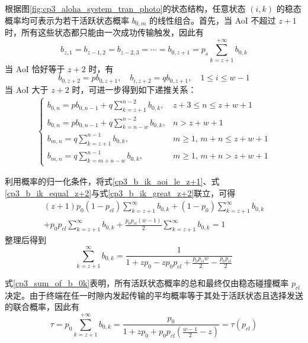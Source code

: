 根据图\ref{fig:cp3_aloha_system_tran_photo}的状态结构，任意状态 $(i,k)$ 的稳态概率均可表示为若干活跃状态概率 $b_{0,m}$ 的线性组合。首先，当 AoI 不超过 $z+1$ 时，所有这些状态都只能由一次成功传输触发，因此有
\begin{equation} \label{cp3_b_ik_aoi_le_z+1}
    b_{z,1}=b_{z-1,2}=b_{z-2,3}=\cdots=b_{0,z+1}=p_s\sum_{k=z+1}^{+\infty}b_{0,k}
\end{equation}
当 AoI 恰好等于 $z+2$ 时，有
\begin{equation}\label{cp3_b_ik_equal_z+2}
    b_{0,z+2} = pb_{0,z+1},\quad b_{i,z+2}=qb_{0,z+1},\quad1\leq i \leq w-1
\end{equation}
当 AoI 大于 $z+2$ 时，可进一步得到如下递推关系：
\begin{equation}\label{cp3_b_ik_great_z+2}
\begin{gathered}
\begin{cases}
    \displaystyle b_{0,n} = p b_{0,n-1} + q \sum_{k=z+1}^{n-2} b_{0,k}, & z+3 \le n \le z+w+1 \\[12pt]
    \displaystyle b_{0,n} = p b_{0,n-1} + q \sum_{k=n-w}^{n-2} b_{0,k}, & n > z+w+1 \\[12pt]
    \displaystyle b_{m,n} = q \sum_{k=z+1}^{n-1} b_{0,k}, & m \ge 1, \, m+n \le z+w+1 \\[12pt]
    \displaystyle b_{m,n} = q \sum_{k=m+n-w}^{n-1} b_{0,k}, & m \ge 1, \, m+n > z+w+1
\end{cases}
\end{gathered}
\end{equation}

利用概率的归一化条件，将式\eqref{cp3_b_ik_aoi_le_z+1}、式\eqref{cp3_b_ik_equal_z+2}与式\eqref{cp3_b_ik_great_z+2}联立，可得
\begin{equation}
\begin{split}
(z+1)p_0(1-p_{cl}) \sum_{k=z+1}^{\infty} b_{0,k} + (1-p_0) \sum_{k=z+1}^{\infty} b_{0,k} \\
+ p_0 p_{cl} \sum_{k=z+1}^{\infty} b_{0,k} + \frac{p_0 p_{cl}(w-1)}{2} \sum_{k=z+1}^{\infty} b_{0,k} = 1
\end{split}
\end{equation}
整理后得到
\begin{equation}\label{cp3_sum_of_b_0k}
\sum_{k=z+1}^{\infty} b_{0,k} = \frac{1}{1 + z p_0 - z p_0 p_{cl} + \frac{p_0 p_{cl} w}{2} - \frac{p_0 p_{cl}}{2}}
\end{equation}

式\eqref{cp3_sum_of_b_0k}表明，所有活跃状态概率的总和最终仅由稳态碰撞概率 $p_{cl}$ 决定。由于终端在任一时隙内发起传输的平均概率等于其处于活跃状态且选择发送的联合概率，因此有
\begin{equation}\label{cp3_avg_send_prob}
    \tau=p_0\sum_{k=z+1}^{+\infty}b_{0,k}=\frac{p_0}{1+zp_0+p_0p_{cl}(\frac{w-1}{2}-z)}=\tau(p_{cl})
\end{equation}

